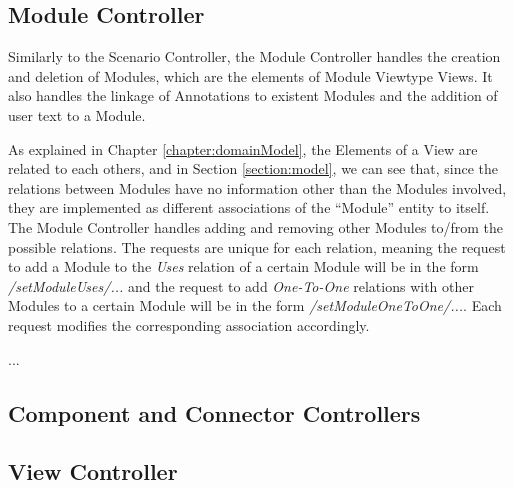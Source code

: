 \subsection{Module Controller}

Similarly to the Scenario Controller, the Module Controller handles the creation and deletion of Modules, which are the elements of Module Viewtype Views. It also handles the linkage of Annotations to existent Modules and the addition of user text to a Module.

As explained in Chapter \ref{chapter:domainModel}, the Elements of a View are related to each others, and in Section \ref{section:model}, we can see that, since the relations between Modules have no information other than the Modules involved, they are implemented as different associations of the ``Module'' entity to itself. The Module Controller handles adding and removing other Modules to/from the possible relations. The requests are unique for each relation, meaning the request to add a Module to the \textit{Uses} relation of a certain Module will be in the form \textit{/setModuleUses/...} and the request to add \textit{One-To-One} relations with other Modules to a certain Module will be in the form \textit{/setModuleOneToOne/...}. Each request modifies the corresponding association accordingly. 

...
\subsection{Component and Connector Controllers}

\subsection{View Controller}
\label{substection:viewController}
